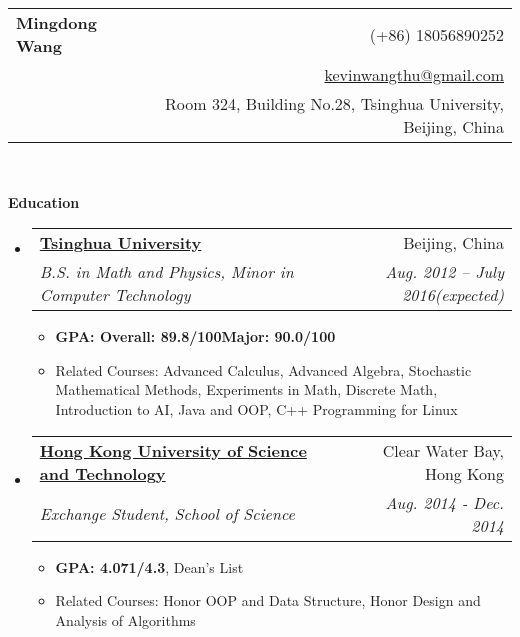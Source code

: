 \documentclass[letterpaper,11pt]{article}
\makeatletter
\newcommand{\resitem}[1]{\item #1 \vspace{-2pt}}
\newcommand{\resheading}[1]{{\large \colorbox{mygrey}{\begin{minipage}{\textwidth}{\textbf{#1 \vphantom{p\^{E}}}}\end{minipage}}}}
\newcommand{\ressubheading}[4]{
  \begin{tabular*}{6.5in}{l@{\extracolsep{\fill}}r}
	#1 & #2 \\
    {#3} & \textit{#4} \\
  \end{tabular*}\vspace{-7pt}}
\newcommand{\ressubsubheading}[2]{
  \begin{tabular*}{6.5in}{l@{\extracolsep{\fill}}r}
	\textit{#1} & \textit{#2} \\
  \end{tabular*}\vspace{-7pt}}
\makeatother
\begin{document}
\newcommand{\mywebheader}{
  \begin{tabular*}{7in}{l@{\extracolsep{\fill}}r}
	\textbf{{\LARGE Mingdong Wang}} &{(+86) 18056890252}\\
	& \href{mailto:kevinwangthu@gmail.com}{kevinwangthu@gmail.com}\\
    & Room 324, Building No.28, Tsinghua University, Beijing, China
  \end{tabular*}
  \\
  \vspace{0.1in}}

\mywebheader

\resheading{Education}
\begin{itemize}
\item
  \ressubheading{\href{http://www.tsinghua.edu.cn}{\textbf{Tsinghua University}}}{Beijing, China}{\textit{B.S. in Math and Physics, Minor in Computer Technology}}{Aug. 2012 -- July 2016(expected)}
	            {
                  \footnotesize
				  \begin{itemize}
                    \resitem{\textbf{GPA: Overall: 89.8/100\quad Major: 90.0/100}}
                    \resitem{Related Courses: Advanced Calculus, Advanced Algebra, Stochastic Mathematical Methods, Experiments in Math, Discrete Math, Introduction to AI, Java and OOP, C++ Programming for Linux}
				  \end{itemize}
				}
		      \item
			    \ressubheading{\href{http://www.ust.hk}{\textbf{Hong Kong University of Science and Technology}}}{Clear Water Bay, Hong Kong}{\textit{Exchange Student, School of Science}}{Aug. 2014 - Dec. 2014}
				              { \footnotesize
				                \begin{itemize}
				                  \resitem{\textbf{GPA: 4.071/4.3}, Dean's List}
                                  \resitem{Related Courses: Honor OOP and Data Structure, Honor Design and Analysis of Algorithms}
				                \end{itemize}
				              }

\end{itemize} %
\end{document}

